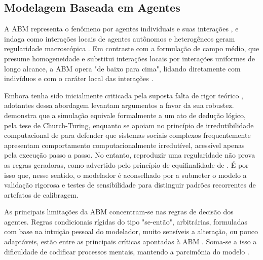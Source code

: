 \documentclass[12pt,oneside,a4paper,brazil,sumario=tradicional]{abntex2}
\begin{document}
\subsection{Modelagem Baseada em Agentes}

A ABM representa o fenômeno por agentes individuais e suas interações \parencite{wilensky2015}, e indaga como interações locais de agentes autônomos e heterogêneos geram regularidade macroscópica \parencite{epstein1999}. Em contraste com a formulação de campo médio, que presume homogeneidade e substitui interações locais por interações uniformes de longo alcance, a ABM opera "de baixo para cima", lidando diretamente com indivíduos e com o caráter local das interações \parencite{boccara2004}.

Embora tenha sido inicialmente criticada pela suposta falta de rigor teórico \parencite{boccara2004}, adotantes dessa abordagem levantam argumentos a favor da sua robustez. \textcite{epstein1999} demonstra que a simulação equivale formalmente a um ato de dedução lógico, pela tese de Church-Turing, enquanto \textcite{namatame2016} se apoiam no princípio de irredutibilidade computacional de \textcite{wolfram2002} para defender que sistemas sociais complexos frequentemente apresentam comportamento computacionalmente irredutível, acessível apenas pela execução passo a passo. No entanto, reproduzir uma regularidade não prova as regras geradoras, como
advertido pelo princípio de equifinalidade de \textcite{bertalanffy1977}. É por isso que, nesse sentido, o modelador é aconselhado por \textcite{wilensky2015} a submeter o modelo a validação rigorosa e testes de sensibilidade para distinguir padrões recorrentes de artefatos de calibragem.

As principais limitações da ABM concentram-se nas regras de decisão dos agentes. Regras condicionais rígidas do tipo "se-então", arbitrárias, formuladas com base na intuição pessoal do modelador, muito sensíveis a alteração, ou pouco adaptáveis, estão entre as principais críticas apontadas à ABM \parencite{crooks2011, adornetto2025, chopra2024, gao2023, larooij2025, schulze2017}. Soma-se a isso a dificuldade de codificar processos mentais, mantendo a parcimônia do modelo \parencite{namatame2016}.
\end{document}
